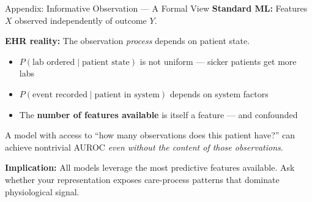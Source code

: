 \documentclass[aspectratio=169,10pt]{beamer}
\begin{document}
\begin{frame}{Appendix: Informative Observation --- A Formal View}
\textbf{Standard ML:} Features $X$ observed independently of outcome $Y$.

\textbf{EHR reality:} The observation \emph{process} depends on patient state.
\begin{itemize}
    \item $P(\text{lab ordered} \mid \text{patient state})$ is not uniform --- sicker patients get more labs
    \item $P(\text{event recorded} \mid \text{patient in system})$ depends on system factors
    \item The \textbf{number of features available} is itself a feature --- and confounded
\end{itemize}
\vspace{0.2em}
A model with access to ``how many observations does this patient have?'' can achieve nontrivial AUROC \emph{even without the content of those observations}.

\vspace{0.2em}
\textbf{Implication:} All models leverage the most predictive features available. Ask whether your representation exposes care-process patterns that dominate physiological signal.
\end{frame}
\end{document}
